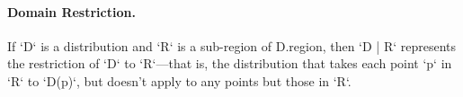 \paragraph{Domain Restriction.} 

If \xcd`D` is a distribution and \xcd`R` is a sub-region of {\cf
D.region}, then \xcd`D | R` represents the restriction of \xcd`D` to
\xcd`R`---that is, the distribution that takes each point \xcd`p` in \xcd`R`
to 
\xcd`D(p)`, 
but doesn't apply to any points but those in \xcd`R`.


